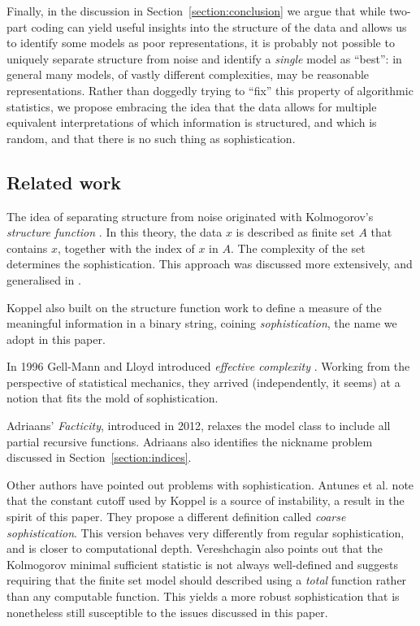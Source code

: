 \documentclass{style/llncs}
\begin{document}
Finally, in the discussion in Section~\ref{section:conclusion} we argue that while two-part coding can yield useful insights into the structure of the data and allows us to identify some models as poor representations, it is probably not possible to uniquely separate structure from noise and identify a \emph{single} model as ``best'': in general many models, of vastly different complexities, may be reasonable representations. Rather than doggedly trying to ``fix'' this property of algorithmic statistics, we propose embracing the idea that the data allows for multiple equivalent interpretations of which information is structured, and which is random, and that there is no such thing as sophistication.

\subsection{Related work}
The idea of separating structure from noise originated with Kolmogorov's \emph{structure function} \cite{cover1985kolmogorov}. In this theory, the data $x$ is described as finite set $A$ that contains $x$, together with the index of $x$ in $A$. The complexity of the set determines the sophistication. This approach was discussed more extensively, and generalised in \cite{vereshchagin2004kolmogorov,gacs2001algorithmic}. 

Koppel \cite{koppelSoph1988,koppel1991almost} also built on the structure function work to define a measure of the meaningful information in a binary string, coining \emph{sophistication}, the name we adopt in this paper. 

In 1996 Gell-Mann and Lloyd introduced \emph{effective complexity} \cite{gellmann1996information}. Working from the perspective of statistical mechanics, they arrived (independently, it seems) at a notion that fits the mold of sophistication.

Adriaans' \emph{Facticity}, introduced in 2012\cite{adriaans2012facticity}, relaxes the model class to include all partial recursive functions. Adriaans also identifies the nickname problem discussed in Section~\ref{section:indices}.

Other authors have pointed out problems with sophistication. Antunes et al. \cite{antunes2009sophistication} note that the constant cutoff used by Koppel is a source of instability, a result in the spirit of this paper. They propose a different definition called \emph{coarse sophistication}. This version behaves very differently from regular sophistication, and is closer to computational depth. Vereshchagin \cite{vereshchagin2013algorithmic} also points out that the Kolmogorov minimal sufficient statistic is not always well-defined and suggests requiring that the finite set model should described using a \emph{total} function rather than any computable function. This yields a more robust sophistication that is nonetheless still susceptible to the issues discussed in this paper.
\end{document}
